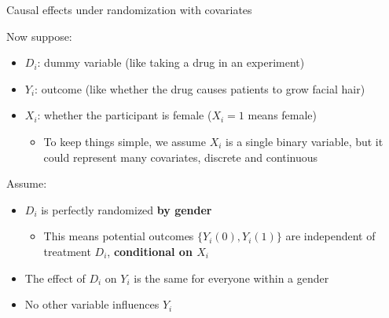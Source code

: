 \begin{frame}[t]{Causal effects under randomization with covariates}


\begin{figure}
\end{figure}

Now suppose: 
\begin{itemize}
    \item $D_i$: dummy variable (like taking a drug in an experiment)
    \item $Y_i$: outcome (like whether the drug causes patients to grow facial hair)
    \item $X_i$: whether the participant is female ($X_i=1$ means female)
    \begin{itemize}
        \item To keep things simple, we assume $X_i$ is a single binary variable,  but it could represent many covariates, discrete and continuous
    \end{itemize}
\end{itemize}

\vspace{2ex}
Assume:
\begin{itemize}
    \item $D_i$ is perfectly randomized \textbf{by gender}
	\begin{itemize}
	\item This means potential outcomes $\{Y_i (0),  Y_i (1)\}$ are independent of treatment $D_i$,  \textbf{conditional on $X_i$}
	\end{itemize}
    \item The effect of $D_i$ on $Y_i$ is the same for everyone within a gender
    \item No other variable influences $Y_i$  
\end{itemize}



\end{frame}

